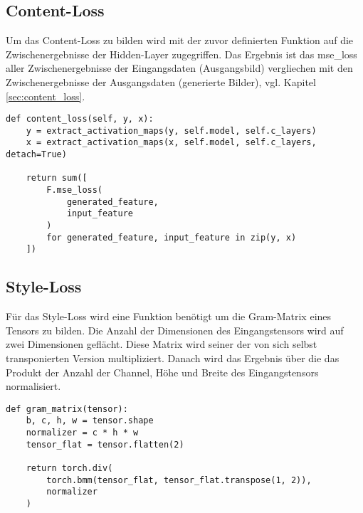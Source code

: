 \pagebreak

\subsection{Content-Loss}

Um das Content-Loss zu bilden wird mit der zuvor definierten Funktion auf die Zwischenergebnisse der Hidden-Layer zugegriffen.
Das Ergebnis ist das \gls{mse_loss} aller Zwischenergebnisse der Eingangsdaten (Ausgangsbild) vergliechen mit den Zwischenergebnisse der Ausgangsdaten (generierte Bilder), vgl. Kapitel \ref{sec:content_loss}.

\begin{listing}[H]
\begin{verbatim}
def content_loss(self, y, x):
    y = extract_activation_maps(y, self.model, self.c_layers)
    x = extract_activation_maps(x, self.model, self.c_layers, detach=True)

    return sum([
        F.mse_loss(
            generated_feature,
            input_feature
        )
        for generated_feature, input_feature in zip(y, x)
    ])
\end{verbatim}
\end{listing}

\subsection{Style-Loss}

Für das Style-Loss wird eine Funktion benötigt um die Gram-Matrix eines Tensors zu bilden. Die Anzahl der Dimensionen des Eingangstensors wird auf zwei Dimensionen geflächt. Diese Matrix wird seiner der von sich selbst transponierten Version multipliziert. Danach wird das Ergebnis über die das Produkt der Anzahl der Channel, Höhe und Breite des Eingangstensors normalisiert.

\begin{listing}[H]
\begin{verbatim}
def gram_matrix(tensor):
    b, c, h, w = tensor.shape
    normalizer = c * h * w
    tensor_flat = tensor.flatten(2)

    return torch.div(
        torch.bmm(tensor_flat, tensor_flat.transpose(1, 2)),
        normalizer
    )
\end{verbatim}
\end{listing}

